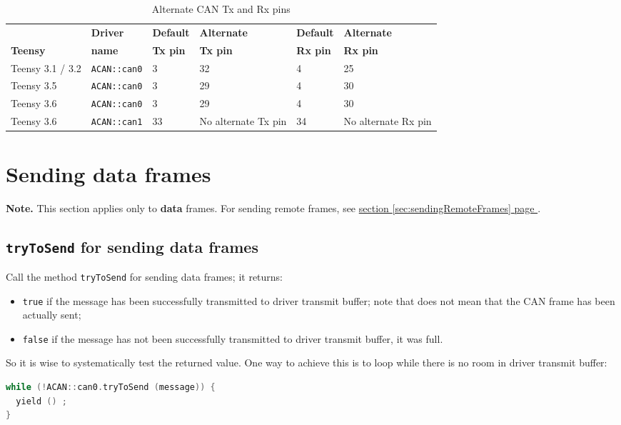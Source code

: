 \documentclass[10pt, a4paper, obeyspaces, openany]{extarticle}
\newcommand \sectionLabel[2]{\section{#1}\label{sec:#2}}
\newcommand\refSectionPage[1]{\hyperref[sec:#1]{section \ref*{sec:#1} page \pageref{sec:#1}}}
\newcommand\labelTableau[1]{\label{tab:#1}}
\begin{document}
\begin{table}[!ht]
  \small
  \onehalfspacing
  \centering
  \begin{tabular}{llllll}
                   &  \textbf{Driver}  &  \textbf{Default} & \textbf{Alternate} & \textbf{Default} & \textbf{Alternate}\\
    \textbf{Teensy}& \textbf{name} & \textbf{Tx pin} & \textbf{Tx pin} & \textbf{ Rx pin} & \textbf{ Rx pin}\\
    Teensy 3.1 / 3.2 & \texttt{ACAN::can0}      & 3        & 32      & 4 & 25\\
    Teensy 3.5 &  \texttt{ACAN::can0}           & 3        & 29      & 4 & 30\\
    Teensy 3.6 &  \texttt{ACAN::can0}           & 3        & 29      & 4 & 30 \\
    Teensy 3.6 &  \texttt{ACAN::can1}           & 33 & No alternate Tx pin & 34 & No alternate Rx pin\\
  \end{tabular}
  \caption{Alternate CAN Tx and Rx pins}
  \labelTableau{alternatePins}
\end{table}


\sectionLabel{Sending data frames}{sendingDataFrames}

{\bf Note. } This section applies only to {\bf data} frames. For sending remote frames, see \refSectionPage{sendingRemoteFrames}.

\subsection{\texttt{tryToSend} for sending data frames}
Call the method \texttt{tryToSend} for sending data frames; it returns:
\begin{itemize}
  \item \texttt{true} if the message has been successfully transmitted to driver transmit buffer; note that does not mean that the CAN frame has been actually sent;
  \item \texttt{false} if the message has not been successfully transmitted to driver transmit buffer, it was full.
\end{itemize}

So it is wise to systematically test the returned value. One way to achieve this is to loop while there is no room in driver transmit buffer:
{ \small
  \begin{lstlisting}[language=c++]
while (!ACAN::can0.tryToSend (message)) {
  yield () ;
}
  \end{lstlisting}
}
\end{document}
